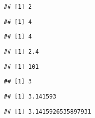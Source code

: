 \documentclass[paper=a4,10pt,div=17,headsepline,BCOR=12mm,twoside,open=right]{scrbook}\usepackage{knitr}
\begin{document}
\begin{knitrout}\footnotesize
{}\color{fgcolor}\begin{kframe}
\begin{alltt}
 \hlopt{+} 
\end{alltt}
\begin{verbatim}
## [1] 2
\end{verbatim}
\begin{alltt}
 \hlopt{*} 
\end{alltt}
\begin{verbatim}
## [1] 4
\end{verbatim}
\begin{alltt}
 \hlopt{+}  \hlopt{/} 
\end{alltt}
\begin{verbatim}
## [1] 4
\end{verbatim}
\begin{alltt}
\hlstd{(} \hlopt{+} \hlstd{)} \hlopt{/} 
\end{alltt}
\begin{verbatim}
## [1] 2.4
\end{verbatim}
\begin{alltt}
\hlopt{^} \hlopt{+} 
\end{alltt}
\begin{verbatim}
## [1] 101
\end{verbatim}
\begin{alltt}
\hlstd{(}\hlstd{)}
\end{alltt}
\begin{verbatim}
## [1] 3
\end{verbatim}
\begin{alltt}
 
\end{alltt}
\begin{verbatim}
## [1] 3.141593
\end{verbatim}
\begin{alltt}
 \hlstd{=}\hlstd{)}
\end{alltt}
\begin{verbatim}
## [1] 3.1415926535897931
\end{verbatim}
\begin{alltt}
 
\end{alltt}

\end{kframe}
\end{knitrout}
\end{document}
